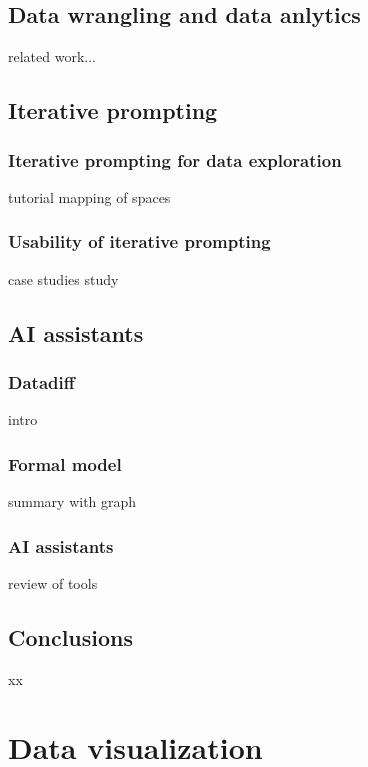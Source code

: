 \documentclass[fleqn,11pt]{report}
\theoremstyle{definition}
\begin{document}
\section{Data wrangling and data anlytics}
related work...

\section{Iterative prompting}

\subsection{Iterative prompting for data exploration}
tutorial
mapping of spaces

\subsection{Usability of iterative prompting}
case studies
study

\section{AI assistants}

\subsection{Datadiff}
intro

\subsection{Formal model}
summary with graph

\subsection{AI assistants}
review of tools

\section{Conclusions}
xx


\chapter{Data visualization}
\end{document}
